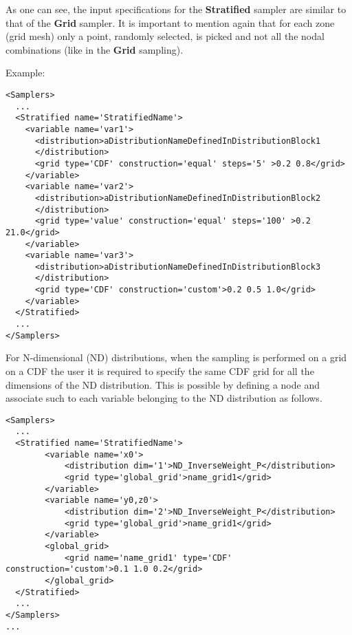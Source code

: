 As one can see, the input specifications for the \textbf{Stratified} sampler are
similar to that of the \textbf{Grid} sampler.
%
It is important to mention again that for each zone (grid mesh) only a point,
randomly selected, is picked and not all the nodal combinations (like in the
\textbf{Grid} sampling).


Example:
\begin{lstlisting}[style=XML,morekeywords={construction,steps,lowerBound,upperBound}]
<Samplers>
  ...
  <Stratified name='StratifiedName'>
    <variable name='var1'>
      <distribution>aDistributionNameDefinedInDistributionBlock1
      </distribution>
      <grid type='CDF' construction='equal' steps='5' >0.2 0.8</grid>
    </variable>
    <variable name='var2'>
      <distribution>aDistributionNameDefinedInDistributionBlock2
      </distribution>
      <grid type='value' construction='equal' steps='100' >0.2 21.0</grid>
    </variable>
    <variable name='var3'>
      <distribution>aDistributionNameDefinedInDistributionBlock3
      </distribution>
      <grid type='CDF' construction='custom'>0.2 0.5 1.0</grid>
    </variable>
  </Stratified>
  ...
</Samplers>
\end{lstlisting}

For N-dimensional  (ND) distributions, when the sampling is performed on a grid on a CDF  the user it is required to specify the same CDF grid for all the dimensions of the ND distribution.
This is possible by defining a  node and associate such  to each variable belonging to the ND distribution as follows.

\begin{lstlisting}[style=XML,morekeywords={ND,grid}]
<Samplers>
  ...
  <Stratified name='StratifiedName'>
        <variable name='x0'>
            <distribution dim='1'>ND_InverseWeight_P</distribution>
            <grid type='global_grid'>name_grid1</grid>
        </variable>
        <variable name='y0,z0'>
            <distribution dim='2'>ND_InverseWeight_P</distribution>
            <grid type='global_grid'>name_grid1</grid>
        </variable>
        <global_grid>
            <grid name='name_grid1' type='CDF' construction='custom'>0.1 1.0 0.2</grid>
        </global_grid>
  </Stratified>
  ...
</Samplers>
...
\end{lstlisting}


